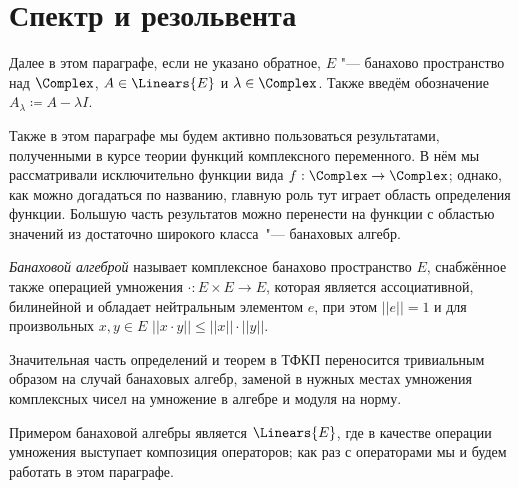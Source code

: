 \documentclass[main]{subfiles}
\begin{document}
\section{Спектр и резольвента} %
%

Далее в этом параграфе,
если не указано обратное,
\( E \) "--- банахово пространство над \( \Complex \),
\( A \in \Linears{E} \) и \( \lambda \in \Complex \).
Также введём обозначение \( A_\lambda \coloneqq A - \lambda I \).

Также в этом параграфе мы будем активно
пользоваться результатами,
полученными в курсе
теории функций комплексного переменного.
В нём мы рассматривали
исключительно функции
вида \( f : \Complex \to \Complex \);
однако, как можно догадаться по названию,
главную роль тут играет область определения функции.
Большую часть результатов можно перенести
на функции с областью значений из достаточно
широкого класса~"--- банаховых алгебр.

\begin{definition}
  \emph{Банаховой алгеброй}
  называет комплексное банахово пространство \( E \),
  снабжённое также операцией умножения
  \( \cdot : E \times E \to E \),
  которая является 
  ассоциативной, билинейной и
  обладает нейтральным элементом \( e \),
  при этом \( ||e|| = 1 \)
  и для произвольных \( x, y \in E \)
  \( ||x \cdot y|| \le ||x|| \cdot ||y|| \).
\end{definition}

Значительная часть определений и теорем в ТФКП
переносится тривиальным образом на случай
банаховых алгебр, заменой в нужных местах
умножения комплексных чисел на умножение в алгебре
и модуля на норму.

Примером банаховой алгебры является
\( \Linears{E} \), где в качестве операции
умножения выступает композиция операторов;
как раз с операторами мы и будем работать в этом параграфе.

%
\end{document}
